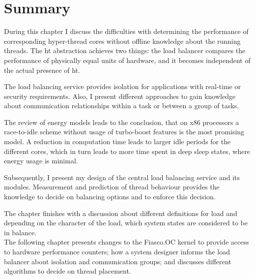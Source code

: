 \section{Summary}
\label{design:summary}

During this chapter I discuss the difficulties with determining the
performance of corresponding hyper-thread cores without offline knowledge about
the running threads.
The \gls{ht} abstraction achieves two things: the load balancer compares the
performance of physically equal units of hardware, and it becomes independent
of the actual presence of \gls{ht}.

The load balancing service provides isolation for applications with real-time
or security requirements.
Also, I present different approaches to gain knowledge about communication
relationships within a task or between a group of tasks.

The review of energy models leads to the conclusion, that on x86
processors a race-to-idle scheme without usage of turbo-boost features is the
most promising model.
A reduction in computation time leads to larger idle periods for the different
cores, which in turn leads to more time spent in deep sleep states, where
energy usage is minimal.

Subsequently, I present my design of the central load balancing service and its
modules.
Measurement and prediction of thread behaviour provides the knowledge to decide
on balancing options and to enforce this decision.

The chapter finishes with a discussion about different definitions for load
and depending on the character of the load, which system states are considered
to be in balance.
\\

The following chapter presents changes to the Fiasco.OC kernel to provide
access to hardware performance counters; how a system designer informs the load
balancer about isolation and communication groups; and discusses different
algorithms to decide on thread placement.
